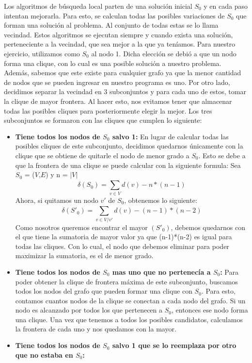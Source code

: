 Los algoritmos de búsqueda local parten de una solución inicial $S_{0}$ y en cada paso intentan mejorarla. Para esto, se calculan todas las posibles variaciones de $S_{0}$ que forman una solución al problema. Al conjunto de todas estas se lo llama vecindad. 
Estos algoritmos se ejecutan siempre y cuando exista una solución, perteneciente a la vecindad, que sea mejor a la que ya teníamos. \newline \newline
Para nuestro ejercicio, utilizamos como $S_{0}$ al nodo 1. Dicha elección se debió a que un nodo forma una clique, con lo cual es una posible solución a nuestro problema. Además, sabemos que este existe para cualquier grafo ya que la menor cantidad de nodos que se pueden ingresar en nuestro programa es uno. 
\newline Por otro lado, decidimos separar la vecindad en 3 subconjuntos y para cada uno de estos, tomar la clique de mayor frontera. Al hacer esto, nos evitamos tener que almacenar todas las posibles cliques para posteriormente elegir la mejor. Los tres subconjuntos se formaron con las cliques que cumplen lo siguiente:
\begin{itemize}
\item \textbf{Tiene todos los nodos de $S_{0}$ salvo 1:} \newline En lugar de calcular todas las posibles cliques de este subconjunto, decidimos quedarnos únicamente con la clique que se obtiene de quitarle el nodo de menor grado a $S_{0}$. Esto se debe a que la frontera de una clique se puede calcular con la siguiente formula:\newline
Sea $S_{0}$ = ($V$,$E$) y n = $|$$V$$|$
\begin{equation}
  \delta(S_{0}) = \sum_{v \in V}^{} d(v) - n*(n-1)
\end{equation}
Ahora, si quitamos un nodo $v'$ de $S_{0}$, obtenemos lo siguiente:
\begin{equation}
  \delta(S'_{0}) = \sum_{v \in V/v'}^{} d(v) - (n-1)*(n-2)
\end{equation}
Como nosotros queremos encontrar el mayor \delta$(S'_{0})$, debemos quedarnos con el que tiene la sumatoria de mayor valor ya que (n-1)*(n-2) es igual para todas las cliques. Con lo cual, el nodo que debemos eliminar para poder maximizar la sumatoria, es el de menor grado.
\item \textbf{Tiene todos los nodos de $S_{0}$ mas uno que no pertenecía a $S_{0}$:} \newline
Para poder obtener la clique de frontera máxima de este subconjunto, buscamos todos los nodos del grafo que pueden formar una clique con $S_{0}$. Para esto, contamos cuantos nodos de la clique se conectan a cada nodo del grafo. Si un nodo es alcanzado por todos los que pertenecen a $S_{0}$, entonces ese nodo forma una clique. Una vez que tenemos a todos los posibles candidatos, calculamos la frontera de cada uno y nos quedamos con la mayor.
\item \textbf{Tiene todos los nodos de $S_{0}$ salvo 1 que se lo reemplaza por otro que no estaba en $S_{0}$:} \newline
\end{itemize}

